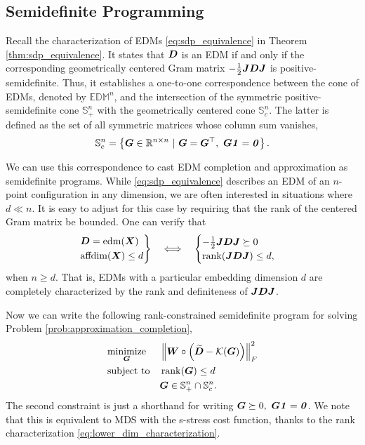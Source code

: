 \documentclass[10pt,double]{IEEEtran}
\providecommand{\R}{\ensuremath{\mathbb{R}}}
\renewcommand{\S}{\ensuremath{\mathbb{S}}}
\providecommand{\norm}[1]{\left\lVert#1\right\rVert}
\providecommand{\set}[1]{\left\{#1\right\}}
\providecommand{\rank}{\mathop{\mathrm{rank}}}
\renewcommand{\vec}[1]{\ensuremath{\boldsymbol{#1}}}
\providecommand{\mat}[1]{\ensuremath{\boldsymbol{#1}}}
\providecommand{\wt}[1]{\ensuremath{\widetilde{#1}}}
\providecommand{\mW}{\mat{W}}
\providecommand{\mX}{\mat{X}}\providecommand{\mY}{\mat{Y}}
\newcommand{\EDM}{\ensuremath{\mathrm{edm}}}
\newcommand{\EDMset}{\ensuremath{\mathbb{EDM}}}
\newcommand{\EDMgram}{\ensuremath{\mathcal{K}}}
\newcommand{\vone}{\ensuremath{\vec{\mathit{1}}}}
\renewcommand{\vzero}{\ensuremath{\vec{\mathit{0}}}}
\newcommand{\T}{\ensuremath{\top}}
\newcommand{\affdim}{\ensuremath{\mathrm{affdim}}}
\begin{document}
\subsection{Semidefinite Programming} \label{sub:semidefinite_programming}

Recall the characterization of EDMs \eqref{eq:sdp_equivalence} in Theorem
\ref{thm:sdp_equivalence}. It states that $\mD$ is an EDM if and only if the
corresponding geometrically centered Gram matrix $-\frac{1}{2} \mJ \mD \mJ$ is
positive-semidefinite. Thus, it establishes a one-to-one correspondence
between the cone of EDMs, denoted by $\EDMset^n$, and the intersection of the
symmetric positive-semidefinite cone $\S_+^n$ with the geometrically centered
cone $\S_c^n$. The latter is defined as the set of all symmetric matrices
whose column sum vanishes,
\begin{equation}
	\S_c^n = \set{\mG \in \R^{n \times n} \ | \ \mG = \mG^\T,\ \mG \vone = \vzero}.
\end{equation}

We can use this correspondence to
cast EDM completion and approximation as semidefinite programs. While
\eqref{eq:sdp_equivalence} describes an EDM of an $n$-point configuration in
any dimension, we are often interested in situations where $d \ll n$. It is
easy to adjust for this case by requiring that the rank of the centered Gram
matrix be bounded. One can verify that
\begin{equation}
\label{eq:lower_dim_characterization}
\begin{rcases*}
	\mD = \EDM(\mX) \\
	\affdim(\mX)  \leq d 
\end{rcases*} \quad
\Longleftrightarrow \quad
\begin{cases}
	-\frac{1}{2} \mJ \mD \mJ \succeq 0 \\
	\rank(\mJ \mD \mJ) \leq d,
\end{cases}
\end{equation}
when $n \geq d$. That is, EDMs with a particular embedding dimension $d$ are
completely characterized by the rank and definiteness of $\mJ \mD \mJ$.

Now we can write the following rank-constrained semidefinite program for
solving Problem \ref{prob:approximation_completion},
\begin{equation}
\label{eq:rank_constrained_sdp}
\begin{aligned}
& \underset{\mG}{\text{minimize}}
& & \norm{\mW \circ \left(\wt{\mD} - \EDMgram(\mG)\right)}_F^2 \\
& \text{subject to}
& &   \rank(\mG) \leq d \\
& & & \mG \in \S^{n}_+ \cap \S^n_c.
\end{aligned}
\end{equation}
The second constraint is just a shorthand for writing $\mG \succeq 0,\ 
\mG\vone = \vzero$. We note that this is equivalent to MDS with the s-stress
cost function, thanks to the rank characterization
\eqref{eq:lower_dim_characterization}.
\end{document}
